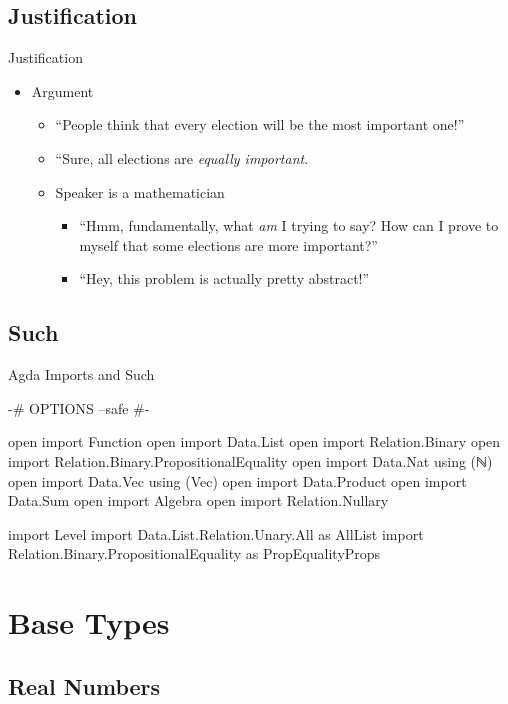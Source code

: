 \documentclass{beamer}
\begin{document}
\subsection{Justification}

\begin{frame}{Justification}
\begin{itemize}
  \item Argument
  \begin{itemize}
    \item ``People think that every election will be the most important one!''
    \item ``Sure, all elections are \emph{equally important}.
    \item Speaker is a mathematician
    \begin{itemize}
      \item ``Hmm, fundamentally, what \emph{am} I trying to say?  How can I prove to myself that some elections are more important?''
      \item ``Hey, this problem is actually pretty abstract!''
    \end{itemize}
  \end{itemize}
\end{itemize}
\end{frame}

\subsection{Such}

\begin{frame}{Agda Imports and Such}
\begin{code}
{-# OPTIONS --safe #-}

open import Function
open import Data.List
open import Relation.Binary
open import Relation.Binary.PropositionalEquality
open import Data.Nat using (ℕ)
open import Data.Vec using (Vec)
open import Data.Product
open import Data.Sum
open import Algebra
open import Relation.Nullary

import Level
import Data.List.Relation.Unary.All as AllList
import Relation.Binary.PropositionalEquality as PropEqualityProps
\end{code}
\end{frame}

\section{Base Types}

\subsection{Real Numbers}
\end{document}
